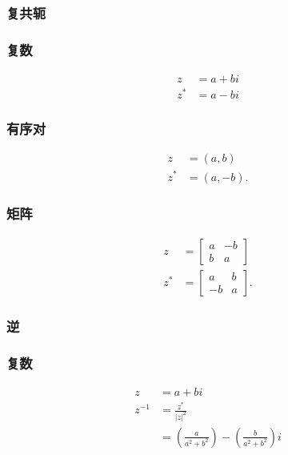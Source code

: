 \subsubsection{复共轭}
\subsubsection*{复数}

$$
\begin{aligned}
z & =a+b i \\
z^{*} & =a-b i
\end{aligned}
$$

\subsubsection*{有序对}
$$
\begin{aligned}
z & =(a, b) \\
z^{*} & =(a,-b) .
\end{aligned}
$$

\subsubsection*{矩阵}

$$
\begin{aligned}
z & =\left[\begin{array}{cc}
a & -b \\
b & a
\end{array}\right] \\
z^{*} & =\left[\begin{array}{cc}
a & b \\
-b & a
\end{array}\right] .
\end{aligned}
$$

\subsubsection{逆}
\subsubsection*{复数}

$$
\begin{aligned}
z & =a+b i \\
z^{-1} & =\frac{z^{*}}{|z|^{2}} \\
& =\left(\frac{a}{a^{2}+b^{2}}\right)-\left(\frac{b}{a^{2}+b^{2}}\right) i
\end{aligned}
$$

